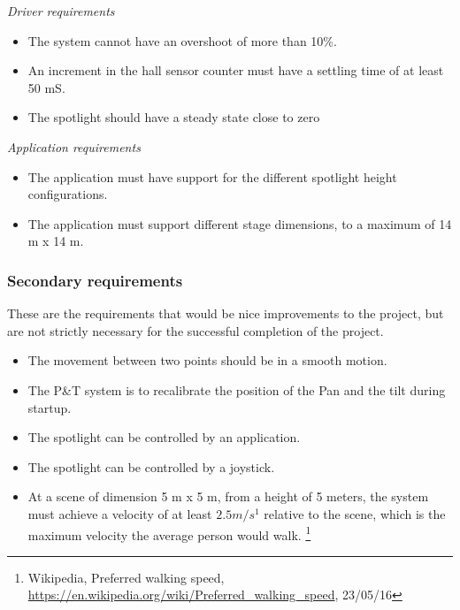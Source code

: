 \textit{Driver requirements}
\begin{itemize}
\item The system cannot have an overshoot of more than 10\%.

\item An increment in the hall sensor counter must have a settling time of at least 50 mS. 

\item The spotlight should have a steady state close to zero
\end{itemize}


\textit{Application requirements}
\begin{itemize}

\item The application must have support for the different spotlight height configurations.

\item The application must support different stage dimensions, to a maximum of 14 m x 14 m. 

\end{itemize}


\subsubsection{Secondary requirements}
These are the requirements that would be nice improvements to the project, but are not strictly necessary for the successful completion of the project. 

\begin{itemize}
\item The movement between two points should be in a smooth motion.

\item The P\&T system is to recalibrate the position of the Pan and the tilt during startup.

\item The spotlight can be controlled by an application.

\item The spotlight can be controlled by a joystick.

\item At a scene of dimension 5 m x 5 m, from a height of 5 meters, the system must achieve a velocity of at least $2.5 m/s^{1}$ relative to the scene, which is the maximum velocity the average person would walk. 
\footnote{Wikipedia, Preferred walking speed, \url{https://en.wikipedia.org/wiki/Preferred_walking_speed}, 23/05/16}

\end{itemize}
